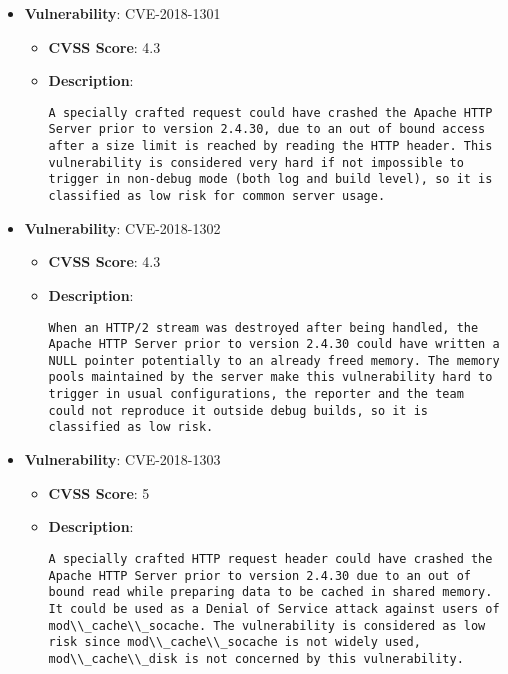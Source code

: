 \documentclass{article}
\begin{document}
\begin{itemize}
        \item \textbf{Vulnerability}: CVE-2018-1301
        \begin{itemize}
            \item \textbf{CVSS Score}:  4.3 
            \item \textbf{Description}:
            \parbox[t]{0.9\linewidth}{
                \verb|A specially crafted request could have crashed the Apache HTTP Server prior to version 2.4.30, due to an out of bound access after a size limit is reached by reading the HTTP header. This vulnerability is considered very hard if not impossible to trigger in non-debug mode (both log and build level), so it is classified as low risk for common server usage.|
            }
        \end{itemize}
    
        \item \textbf{Vulnerability}: CVE-2018-1302
        \begin{itemize}
            \item \textbf{CVSS Score}:  4.3 
            \item \textbf{Description}:
            \parbox[t]{0.9\linewidth}{
                \verb|When an HTTP/2 stream was destroyed after being handled, the Apache HTTP Server prior to version 2.4.30 could have written a NULL pointer potentially to an already freed memory. The memory pools maintained by the server make this vulnerability hard to trigger in usual configurations, the reporter and the team could not reproduce it outside debug builds, so it is classified as low risk.|
            }
        \end{itemize}
    
        \item \textbf{Vulnerability}: CVE-2018-1303
        \begin{itemize}
            \item \textbf{CVSS Score}:  5 
            \item \textbf{Description}:
            \parbox[t]{0.9\linewidth}{
                \verb|A specially crafted HTTP request header could have crashed the Apache HTTP Server prior to version 2.4.30 due to an out of bound read while preparing data to be cached in shared memory. It could be used as a Denial of Service attack against users of mod\\_cache\\_socache. The vulnerability is considered as low risk since mod\\_cache\\_socache is not widely used, mod\\_cache\\_disk is not concerned by this vulnerability.|
            }
        \end{itemize}
    

\end{itemize}
\end{document}
